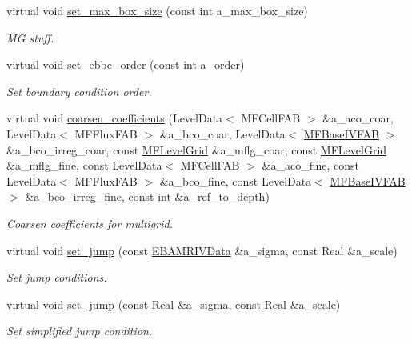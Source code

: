 \begin{DoxyCompactItemize}
virtual void \hyperlink{classmfconductivityopfactory_a45517374fdb1921cd90be39954e82b9e}{set\+\_\+max\+\_\+box\+\_\+size} (const int a\+\_\+max\+\_\+box\+\_\+size)
\begin{DoxyCompactList}\small\item\em MG stuff. \end{DoxyCompactList}\item 
virtual void \hyperlink{classmfconductivityopfactory_a07ccc22ee3f72fdb1dcb32cec4155154}{set\+\_\+ebbc\+\_\+order} (const int a\+\_\+order)
\begin{DoxyCompactList}\small\item\em Set boundary condition order. \end{DoxyCompactList}\item 
virtual void \hyperlink{classmfconductivityopfactory_a4e91f034db85a196d4a8e9f94165c779}{coarsen\+\_\+coefficients} (Level\+Data$<$ M\+F\+Cell\+F\+AB $>$ \&a\+\_\+aco\+\_\+coar, Level\+Data$<$ M\+F\+Flux\+F\+AB $>$ \&a\+\_\+bco\+\_\+coar, Level\+Data$<$ \hyperlink{classMFBaseIVFAB}{M\+F\+Base\+I\+V\+F\+AB} $>$ \&a\+\_\+bco\+\_\+irreg\+\_\+coar, const \hyperlink{classMFLevelGrid}{M\+F\+Level\+Grid} \&a\+\_\+mflg\+\_\+coar, const \hyperlink{classMFLevelGrid}{M\+F\+Level\+Grid} \&a\+\_\+mflg\+\_\+fine, const Level\+Data$<$ M\+F\+Cell\+F\+AB $>$ \&a\+\_\+aco\+\_\+fine, const Level\+Data$<$ M\+F\+Flux\+F\+AB $>$ \&a\+\_\+bco\+\_\+fine, const Level\+Data$<$ \hyperlink{classMFBaseIVFAB}{M\+F\+Base\+I\+V\+F\+AB} $>$ \&a\+\_\+bco\+\_\+irreg\+\_\+fine, const int \&a\+\_\+ref\+\_\+to\+\_\+depth)
\begin{DoxyCompactList}\small\item\em Coarsen coefficients for multigrid. \end{DoxyCompactList}\item 
virtual void \hyperlink{classmfconductivityopfactory_a5cab15d2c64357975af2ede4787c049e}{set\+\_\+jump} (const \hyperlink{type__definitions_8H_a6b8fa905d55cbb491b52180386f0e0c1}{E\+B\+A\+M\+R\+I\+V\+Data} \&a\+\_\+sigma, const Real \&a\+\_\+scale)
\begin{DoxyCompactList}\small\item\em Set jump conditions. \end{DoxyCompactList}\item 
virtual void \hyperlink{classmfconductivityopfactory_ad90748284d77b61b014511c90302f03f}{set\+\_\+jump} (const Real \&a\+\_\+sigma, const Real \&a\+\_\+scale)
\begin{DoxyCompactList}\small\item\em Set simplified jump condition. \end{DoxyCompactList}\item 

\end{DoxyCompactItemize}
